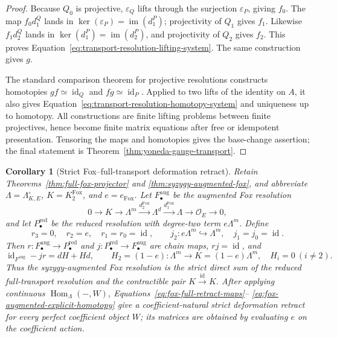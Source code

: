 \documentclass[11pt]{article}
\newtheorem{corollary}[theorem]{Corollary}
\theoremstyle{definition}
\begin{document}
\begin{proof}
Because $Q_0$ is projective, $\varepsilon_Q$ lifts through the surjection
$\varepsilon_P$, giving $f_0$.  The map $f_0d_1^Q$ lands in
$\ker(\varepsilon_P)=\operatorname{im}(d_1^P)$; projectivity of $Q_1$ gives
$f_1$.  Likewise $f_1d_2^Q$ lands in
$\ker(d_1^P)=\operatorname{im}(d_2^P)$, and projectivity of $Q_2$ gives $f_2$.
This proves Equation~\eqref{eq:transport-resolution-lifting-system}.  The same
construction gives $g$.

The standard comparison theorem for projective resolutions constructs
homotopies $gf\simeq\operatorname{id}_Q$ and
$fg\simeq\operatorname{id}_P$.  Applied to two lifts of the identity on $A$,
it also gives Equation~\eqref{eq:transport-resolution-homotopy-system} and
uniqueness up to homotopy.  All constructions are finite lifting problems
between finite projectives, hence become finite matrix equations after free or
idempotent presentation.  Tensoring the maps and homotopies gives the
base-change assertion; the final statement is Theorem~\ref{thm:yoneda-gauge-transport}.
\end{proof}

\begin{corollary}[Strict Fox--full-transport deformation retract]\label{cor:fox-full-transport-retract}
Retain Theorems~\ref{thm:full-fox-projector} and
\ref{thm:syzygy-augmented-fox}, and abbreviate
$\Lambda=\Lambda_{K,E}^{\circ}$,
$K=K_2^{\mathrm{Fox}}$, and $e=e_{\mathrm{Fox}}$.  Let
$F_\bullet^{\mathrm{aug}}$ be the augmented Fox resolution
\[
0\longrightarrow K\longrightarrow\Lambda^m
\xrightarrow{d_2^{\mathrm{Fox}}}\Lambda^d
\xrightarrow{d_1^{\mathrm{Fox}}}\Lambda
\longrightarrow\mathcal O_E\longrightarrow0,
\]
and let $P_\bullet^{\mathrm{red}}$ be the reduced resolution with degree-two
term $e\Lambda^m$.  Define
\begin{equation}\label{eq:fox-full-retract-maps}
 r_3=0,
 \quad r_2=e,
 \quad r_1=r_0=\operatorname{id},
 \qquad
 j_2:e\Lambda^m\hookrightarrow\Lambda^m,
 \quad j_1=j_0=\operatorname{id}.
\end{equation}
Then $r:F_\bullet^{\mathrm{aug}}\to P_\bullet^{\mathrm{red}}$ and
$j:P_\bullet^{\mathrm{red}}\to F_\bullet^{\mathrm{aug}}$ are chain maps,
$rj=\operatorname{id}$, and
\begin{equation}\label{eq:fox-augmented-explicit-homotopy}
 \operatorname{id}_{F^{\mathrm{aug}}}-jr=dH+Hd,
 \qquad
 H_2=(1-e):\Lambda^m\longrightarrow K=(1-e)\Lambda^m,
 \quad H_i=0\ (i\ne2).
\end{equation}
Thus the syzygy-augmented Fox resolution is the strict direct sum of the
reduced full-transport resolution and the contractible pair
$K\xrightarrow{\operatorname{id}}K$.  After applying continuous
$\operatorname{Hom}_\Lambda(-,W)$, Equations~\eqref{eq:fox-full-retract-maps}--
\eqref{eq:fox-augmented-explicit-homotopy} give a coefficient-natural strict
deformation retract for every perfect coefficient object $W$; its matrices are
obtained by evaluating $e$ on the coefficient action.
\end{corollary}
\end{document}
